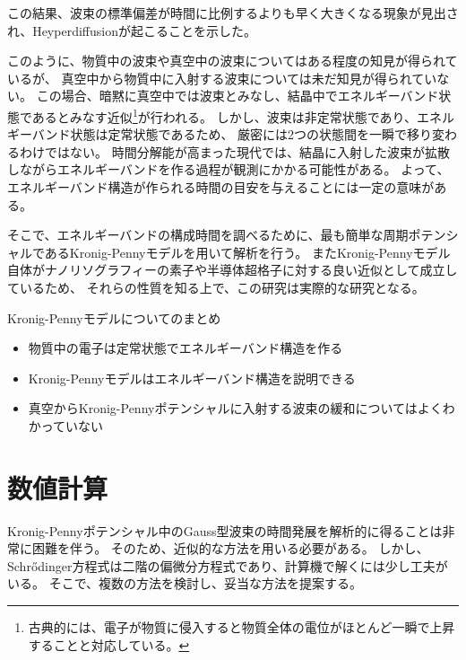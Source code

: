 \documentclass[autodetect-engine,dvipdfmx-if-dvi,ja=standard,a4paper,layout=v2]{bxjsreport}
\begin{document}
    この結果、波束の標準偏差が時間に比例するよりも早く大きくなる現象が見出され、Heyperdiffusionが起こることを示した。\par
    このように、物質中の波束や真空中の波束についてはある程度の知見が得られているが、
    真空中から物質中に入射する波束については未だ知見が得られていない。
    この場合、暗黙に真空中では波束とみなし、結晶中でエネルギーバンド状態であるとみなす近似\footnote{
    古典的には、電子が物質に侵入すると物質全体の電位がほとんど一瞬で上昇することと対応している。
    }が行われる。
    しかし、波束は非定常状態であり、エネルギーバンド状態は定常状態であるため、
    厳密には2つの状態間を一瞬で移り変わるわけではない。
    時間分解能が高まった現代では、結晶に入射した波束が拡散しながらエネルギーバンドを作る過程が観測にかかる可能性がある。
    よって、エネルギーバンド構造が作られる時間の目安を与えることには一定の意味がある。\par
    そこで、エネルギーバンドの構成時間を調べるために、最も簡単な周期ポテンシャルであるKronig-Pennyモデルを用いて解析を行う。
    またKronig-Pennyモデル自体がナノリソグラフィーの素子や半導体超格子に対する良い近似として成立しているため、
    それらの性質を知る上で、この研究は実際的な研究となる。
    \begin{itembox}[l]{Kronig-Pennyモデルについてのまとめ}
      \begin{itemize}
        \item 物質中の電子は定常状態でエネルギーバンド構造を作る
        \item Kronig-Pennyモデルはエネルギーバンド構造を説明できる
        \item 真空からKronig-Pennyポテンシャルに入射する波束の緩和についてはよくわかっていない
      \end{itemize}
    \end{itembox}
    \chapter{数値計算}
    \begin{chapterabstract}
        Kronig-Pennyポテンシャル中のGauss型波束の時間発展を解析的に得ることは非常に困難を伴う。
        そのため、近似的な方法を用いる必要がある。
        しかし、Schrődinger方程式は二階の偏微分方程式であり、計算機で解くには少し工夫がいる。
        そこで、複数の方法を検討し、妥当な方法を提案する。
    \end{chapterabstract}
\end{document}
